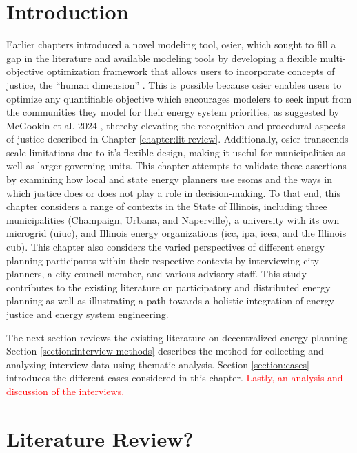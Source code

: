 \section{Introduction}

Earlier chapters introduced a novel modeling tool, \ac{osier}, which sought to
fill a gap in the literature and available modeling tools by developing a
flexible multi-objective optimization framework that allows users to incorporate
concepts of justice, the ``human dimension'' \cite{pfenninger_energy_2014}. This
is possible because \ac{osier} enables users to optimize any quantifiable
objective which encourages modelers to seek input from the communities they
model for their energy system priorities, as suggested by McGookin et al. 2024
\cite{mcgookin_advancing_2024}, thereby elevating the recognition and procedural
aspects of justice described in Chapter \ref{chapter:lit-review}. Additionally,
\ac{osier} transcends scale limitations due to it's flexible design, making it
useful for municipalities as well as larger governing units. This chapter
attempts to validate these assertions by examining how local and state energy
planners use \acp{esom} and the ways in which justice does or does not play a
role in decision-making. To that end, this chapter considers a range of contexts
in the State of Illinois, including three municipalities (Champaign, Urbana, and
Naperville), a university with its own microgrid (\acf{uiuc}), and Illinois
energy organizations (\acf{icc}, \acf{ipa}, \acf{icea}, and the Illinois
\acf{cub}). This chapter also considers the varied perspectives of different
energy planning participants within their respective contexts by interviewing
city planners, a city council member, and various advisory staff. This study
contributes to the existing literature on participatory and distributed energy
planning as well as illustrating a path towards a holistic integration of energy
justice and energy system engineering.

The next section reviews the existing literature on decentralized energy
planning. Section \ref{section:interview-methods} describes the method for
collecting and analyzing interview data using thematic analysis. Section
\ref{section:cases} introduces the different cases considered in this chapter.
\textcolor{red}{Lastly, an analysis and discussion of the interviews.}


\section{Literature Review?}


